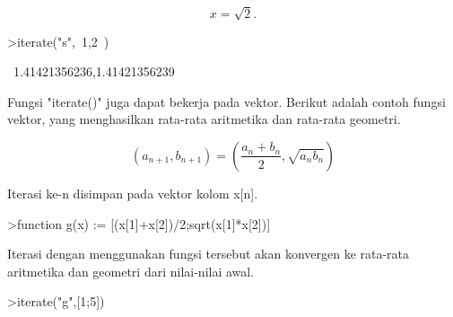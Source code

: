 \documentclass[12pt,Times new roman,letterpaper]{book}
\begin{document}
\begin{eulernootebook}
\begin{eulercomment}
\begin{eulercomment}
\begin{eulernootebook}
\begin{eulercomment}
\begin{eulercomment}
\begin{eulercomment}
\begin{eulercomment}
\begin{eulercomment}
\begin{eulercomment}
\begin{eulernotebook}
\begin{eulercomment}
\begin{eulercomment}
\begin{eulercomment}
\begin{eulercomment}
\begin{eulercomment}
\begin{eulercomment}
\begin{eulercomment}
\begin{eulercomment}
\begin{eulercomment}
\begin{eulercomment}
\begin{eulercomment}
\begin{eulercomment}
\begin{eulercomment}
\begin{eulercomment}
\begin{eulercomment}
\begin{eulercomment}
\begin{eulercomment}
\begin{eulercomment}
\begin{eulercomment}
\begin{eulercomment}
\begin{eulercomment}
\begin{eulercomment}
\begin{eulercomment}
\begin{eulercomment}
\begin{eulercomment}
\begin{eulercomment}
\begin{eulercomment}
\begin{eulercomment}
\begin{eulercomment}
\begin{eulercomment}
\begin{eulercomment}
\end{eulercomment}
\begin{eulerformula}
\[
x = \sqrt2.
\]
\end{eulerformula}
\begin{eulerprompt}
>iterate("s",~1,2~)
\end{eulerprompt}
\begin{euleroutput}
  ~1.41421356236,1.41421356239~
\end{euleroutput}
\begin{eulercomment}
Fungsi "iterate()" juga dapat bekerja pada vektor. Berikut adalah
contoh fungsi vektor, yang menghasilkan rata-rata aritmetika dan
rata-rata geometri.

\end{eulercomment}
\begin{eulerformula}
\[
(a_{n+1},b_{n+1}) = \left( \frac{a_n+b_n}{2}, \sqrt{a_nb_n} \right)
\]
\end{eulerformula}
\begin{eulercomment}
Iterasi ke-n disimpan pada vektor kolom x[n].
\end{eulercomment}
\begin{eulerprompt}
>function g(x) := [(x[1]+x[2])/2;sqrt(x[1]*x[2])]
\end{eulerprompt}
\begin{eulercomment}
Iterasi dengan menggunakan fungsi tersebut akan konvergen ke rata-rata
aritmetika dan geometri dari nilai-nilai awal. 
\end{eulercomment}
\begin{eulerprompt}
>iterate("g",[1;5])
\end{eulerprompt}

\end{eulercomment}
\end{eulercomment}
\end{eulercomment}
\end{eulercomment}
\end{eulercomment}
\end{eulercomment}
\end{eulercomment}
\end{eulercomment}
\end{eulercomment}
\end{eulercomment}
\end{eulercomment}
\end{eulercomment}
\end{eulercomment}
\end{eulercomment}
\end{eulercomment}
\end{eulercomment}
\end{eulercomment}
\end{eulercomment}
\end{eulercomment}
\end{eulercomment}
\end{eulercomment}
\end{eulercomment}
\end{eulercomment}
\end{eulercomment}
\end{eulercomment}
\end{eulercomment}
\end{eulercomment}
\end{eulercomment}
\end{eulercomment}
\end{eulercomment}
\end{eulernotebook}
\end{eulercomment}
\end{eulercomment}
\end{eulercomment}
\end{eulercomment}
\end{eulercomment}
\end{eulercomment}
\end{eulernootebook}
\end{eulercomment}
\end{eulercomment}
\end{eulernootebook}
\end{document}

